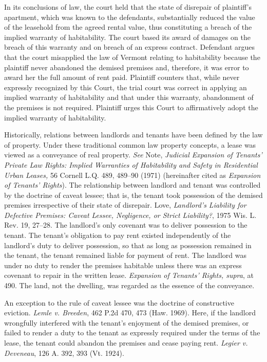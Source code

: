In its conclusions of law, the court held that the state of disrepair of
plaintiff's apartment, which was known to the defendants, substantially reduced
the value of the leasehold from the agreed rental value, thus constituting a
breach of the implied warranty of habitability. The court based its award of
damages on the breach of this warranty and on breach of an express contract.
Defendant argues that the court misapplied the law of Vermont relating to
habitability because the plaintiff never abandoned the demised premises and,
therefore, it was error to award her the full amount of rent paid. Plaintiff
counters that, while never expressly recognized by this Court, the trial court
was correct in applying an implied warranty of habitability and that under this
warranty, abandonment of the premises is not required. Plaintiff urges this
Court to affirmatively adopt the implied warranty of habitability.

Historically, relations between landlords and tenants have been defined by the
law of property. Under these traditional common law property concepts, a lease
was viewed as a conveyance of real property. \textit{See} Note, \emph{Judicial
Expansion of Tenants' Private Law Rights: Implied Warranties of Habitability
and Safety in Residential Urban Leases,} 56 Cornell L.Q. 489, 489--90 (1971)
(hereinafter cited as \emph{Expansion of Tenants' Rights}). The relationship
between landlord and tenant was controlled by the doctrine of caveat lessee;
that is, the tenant took possession of the demised premises irrespective of
their state of disrepair. Love, \emph{Landlord's Liability for Defective
Premises: Caveat Lessee, Negligence, or Strict Liability?}, 1975 Wis. L. Rev.
19, 27--28. The landlord's only covenant was to deliver possession to the
tenant. The tenant's obligation to pay rent existed independently of the
landlord's duty to deliver possession, so that as long as possession remained
in the tenant, the tenant remained liable for payment of rent. The landlord was
under no duty to render the premises habitable unless there was an express
covenant to repair in the written lease. \emph{Expansion of Tenants' Rights,
supra}, at 490. The land, not the dwelling, was regarded as the essence of the
conveyance.

An exception to the rule of caveat lessee was the doctrine of constructive
eviction. \textit{Lemle v. Breeden}, 462 P.2d 470, 473 (Haw. 1969). Here, if
the landlord wrongfully interfered with the tenant's enjoyment of the demised
premises, or failed to render a duty to the tenant as expressly required under
the terms of the lease, the tenant could abandon the premises and cease paying
rent. \textit{Legier v. Deveneau}, 126 A. 392, 393 (Vt. 1924).

